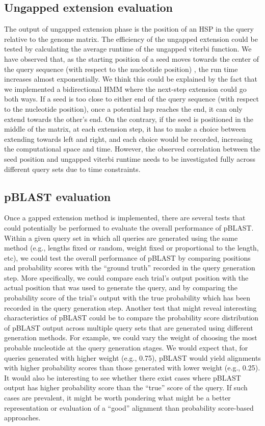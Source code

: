 \documentclass[12pt]{article}
\begin{document}
\subsection{Ungapped extension evaluation}
The output of ungapped extension phase is the position of an HSP in the query relative to the genome matrix. The efficiency of the ungapped extension could be tested by calculating the average runtime of the ungapped viterbi function. We have observed that, as the starting position of a seed moves towards the center of the query sequence (with respect to the nucleotide position) , the run time increases almost exponentially.  We think this could be explained by the fact that we implemented a bidirectional HMM where the next-step extension could go both ways. If a seed is too close to either end of the query sequence (with respect to the nucleotide position), once a potential hsp reaches the end, it can only extend towards the other’s end. On the contrary, if the seed is positioned in the middle of the matrix, at each extension step, it has to make a choice between extending towards left and right, and each choice would be recorded, increasing the computational space and time. However, the observed correlation between the seed position and ungapped viterbi runtime needs to be investigated fully across different query sets due to time constraints. 

\subsection{pBLAST evaluation}

Once a gapped extension method is implemented, there are several tests that could potentially be performed to evaluate the overall performance of pBLAST. Within a given query set in which all queries are generated using the same method (e.g., lengths fixed or random, weight fixed or proportional to the length, etc), we could test the overall performance of pBLAST by comparing positions and probability scores with the “ground truth” recorded in the query generation step. More specifically, we could compare each trial’s output position with the actual position that was used to generate the query, and by comparing the probability score of the trial’s output with the true probability which has been recorded in the query generation step. Another test that might reveal interesting characteristics of pBLAST could be to compare the probability score distribution of pBLAST output across multiple query sets that are generated using different generation methods. For example, we could vary the weight of choosing the most probable nucleotide at the query generation stages. We would expect that, for queries generated with higher weight (e.g., 0.75), pBLAST would yield alignments with higher probability scores than those generated with lower weight (e.g., 0.25). It would also be interesting to see whether there exist cases where pBLAST output has higher probability score than the “true” score of the query. If such cases are prevalent, it might be worth pondering what might be a better representation or evaluation of a “good” alignment than probability score-based approaches. 
\end{document}
